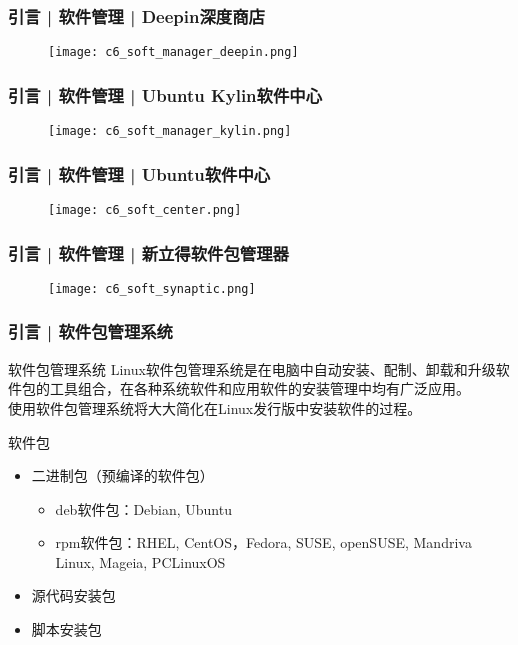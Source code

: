\begin{frame}
  \frametitle{引言 | 软件管理 | Deepin深度商店}
  \begin{figure}
    \centering
    \texttt{[image: c6\_soft\_manager\_deepin.png]}
  \end{figure}
\end{frame}

\begin{frame}
  \frametitle{引言 | 软件管理 | Ubuntu Kylin软件中心}
  \begin{figure}
    \centering
    \texttt{[image: c6\_soft\_manager\_kylin.png]}
  \end{figure}
\end{frame}

\begin{frame}
  \frametitle{引言 | 软件管理 | Ubuntu软件中心}
  \begin{figure}
    \centering
    \texttt{[image: c6\_soft\_center.png]}
  \end{figure}
\end{frame}

\begin{frame}
  \frametitle{引言 | 软件管理 | 新立得软件包管理器}
  \begin{figure}
    \centering
    \texttt{[image: c6\_soft\_synaptic.png]}
  \end{figure}
\end{frame}

\begin{frame}
  \frametitle{引言 | 软件包管理系统}
  \begin{block}{软件包管理系统}
    Linux软件包管理系统是在电脑中自动安装、配制、卸载和升级软件包的工具组合，在各种系统软件和应用软件的安装管理中均有广泛应用。\\
    使用软件包管理系统将大大简化在Linux发行版中安装软件的过程。
  \end{block}
  \pause
  \begin{block}{\alert{软件包}}
    \begin{itemize}
      \item 二进制包（预编译的软件包）
	\begin{itemize}
	  \item deb软件包：Debian, Ubuntu
	  \item rpm软件包：RHEL, CentOS，Fedora, SUSE, openSUSE, Mandriva Linux, Mageia, PCLinuxOS
	\end{itemize}
      \item 源代码安装包
      \item 脚本安装包
    \end{itemize}
  \end{block}
\end{frame}

